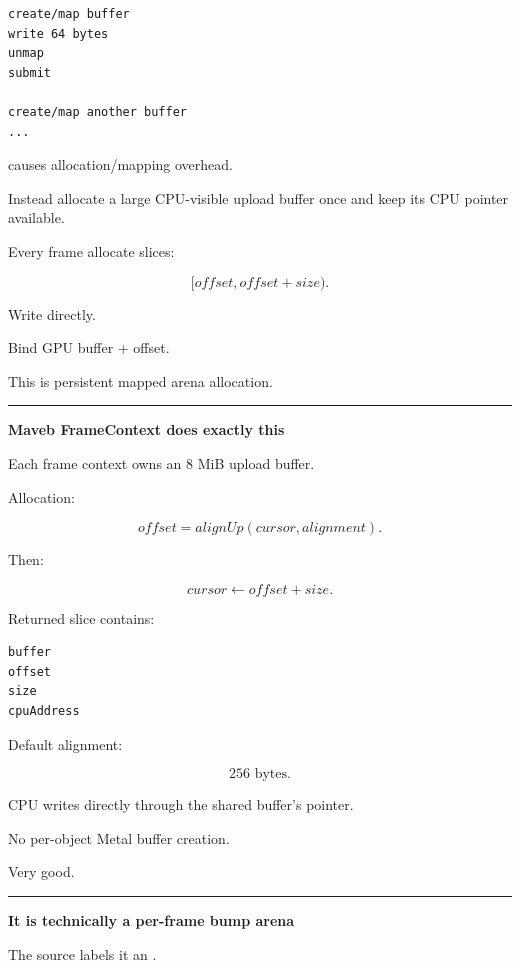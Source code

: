 \protect{}\label{p10-map-everything}%
\begin{verbatim}
create/map buffer
write 64 bytes
unmap
submit

create/map another buffer
...
\end{verbatim}

causes allocation/mapping overhead.

Instead allocate a large CPU-visible upload buffer once and keep its CPU pointer available.

Every frame allocate slices:

\[
[offset,offset+size).
\]

Write directly.

Bind GPU buffer + offset.

This is persistent mapped arena allocation.

\begin{center}\rule{0.5\linewidth}{0.5pt}\end{center}

\textbf{Maveb FrameContext does exactly this}

Each frame context owns an 8 MiB  upload buffer.

Allocation:

\[
offset=
alignUp(cursor,alignment).
\]

Then:

\[
cursor\leftarrow offset+size.
\]

Returned slice contains:

\protect{}\label{p10-slice}%
\begin{verbatim}
buffer
offset
size
cpuAddress
\end{verbatim}

Default alignment:

\[
256\text{ bytes}.
\]

CPU writes directly through the shared buffer's  pointer.

No per-object Metal buffer creation.

Very good.

\begin{center}\rule{0.5\linewidth}{0.5pt}\end{center}

\textbf{It is technically a per-frame bump arena}

The source labels it an .

